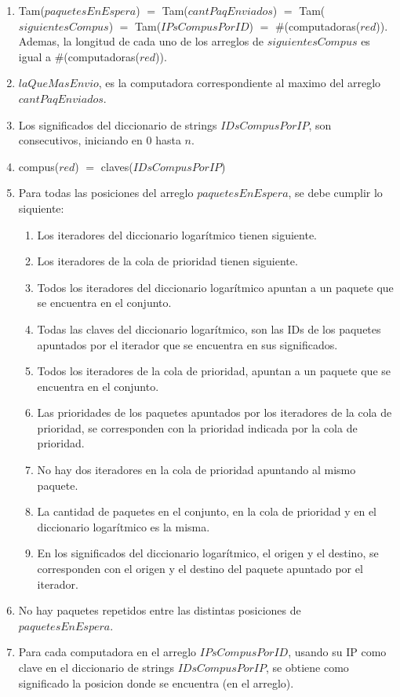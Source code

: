 \begin{Representacion}
    \begin{enumerate} 
      \item Tam($paquetesEnEspera$) $=$ Tam($cantPaqEnviados$) $=$ Tam($siguientesCompus$) $=$ Tam($IPsCompusPorID$) $=$ $\#$(computadoras($red$)). Ademas, la longitud de cada uno de los arreglos de $siguientesCompus$ es igual a \#(computadoras($red$)).
      \item $laQueMasEnvio$, es la computadora correspondiente al maximo del arreglo $cantPaqEnviados$.
      \item Los significados del diccionario de strings $IDsCompusPorIP$, son consecutivos, iniciando en 0 hasta $n$.
      \item compus($red$) $=$ claves($IDsCompusPorIP$)
      \item Para todas las posiciones del arreglo $paquetesEnEspera$, se debe cumplir lo siquiente:
      \begin{enumerate} 
        \item Los iteradores del diccionario logar\'itmico tienen siguiente.
        \item Los iteradores de la cola de prioridad tienen siguiente.
        \item Todos los iteradores del diccionario logar\'itmico apuntan a un paquete que se encuentra en el conjunto.
        \item Todas las claves del diccionario logar\'itmico, son las IDs de los paquetes apuntados por el iterador que se encuentra en sus significados.
        \item Todos los iteradores de la cola de prioridad, apuntan a un paquete que se encuentra en el conjunto.
        \item Las prioridades de los paquetes apuntados por los iteradores de la cola de prioridad, se corresponden con la prioridad indicada por la cola de prioridad.
        \item No hay dos iteradores en la cola de prioridad apuntando al mismo paquete.
        \item La cantidad de paquetes en el conjunto, en la cola de prioridad y en el diccionario logar\'itmico es la misma.
        \item En los significados del diccionario logar\'itmico, el origen y el destino, se corresponden con el origen y el destino del paquete apuntado por el iterador.
      \end{enumerate}
      \item No hay paquetes repetidos entre las distintas posiciones de $paquetesEnEspera$.
      \item Para cada computadora en el arreglo $IPsCompusPorID$, usando su IP como clave en el diccionario de strings $IDsCompusPorIP$, se obtiene como significado la posicion donde se encuentra (en el arreglo).

\end{enumerate}
\end{Representacion}

